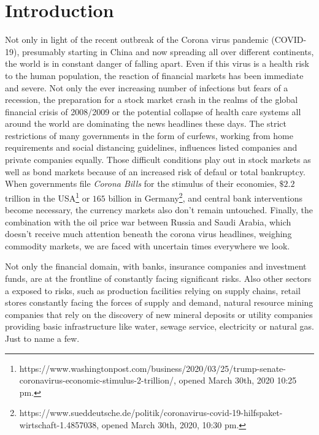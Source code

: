 \section{Introduction}
\setcounter{section}{1}
\label{CH:Intro}
\setcounter{page}{1}


Not only in light of the recent outbreak of the Corona virus pandemic (COVID-19), presumably starting in China and now spreading all over different continents, the world is in constant danger of falling apart. Even if this virus is a health risk to the human population, the reaction of financial markets has been immediate and severe. Not only the ever increasing number of infections but fears of a recession, the preparation for a stock market crash in the realms of the global financial crisis of 2008/2009 or the potential collapse of health care systems all around the world are dominating the news headlines these days. The strict restrictions of many governments in the form of curfews, working from home requirements and social distancing guidelines, influences listed companies and private companies equally. Those difficult conditions play out in stock markets as well as bond markets because of an increased risk of defaul or total bankruptcy. When governments file \textit{Corona Bills} for the stimulus of their economies, $\$ 2.2$ trillion in the USA\footnote{https://www.washingtonpost.com/business/2020/03/25/trump-senate-coronavirus-economic-stimulus-2-trillion/, opened March 30th, 2020 10:25 pm.} or \EUR{}$165$ billion in Germany\footnote{https://www.sueddeutsche.de/politik/coronavirus-covid-19-hilfspaket-wirtschaft-1.4857038, opened March 30th, 2020, 10:30 pm.}, and central bank interventions become necessary, the currency markets also don't remain untouched. Finally, the combination with the oil price war between Russia and Saudi Arabia, which doesn't receive much attention beneath the corona virus headlines, weighing commodity markets, we are faced with uncertain times everywhere we look.

Not only the financial domain, with banks, insurance companies and investment funds, are at the frontline of constantly facing significant risks. Also other sectors a exposed to risks, such as production facilities relying on supply chains, retail stores constantly facing the forces of supply and demand, natural resource mining companies that rely on the discovery of new mineral deposits or utility companies providing basic infrastructure like water, sewage service, electricity or natural gas. Just to name a few.

